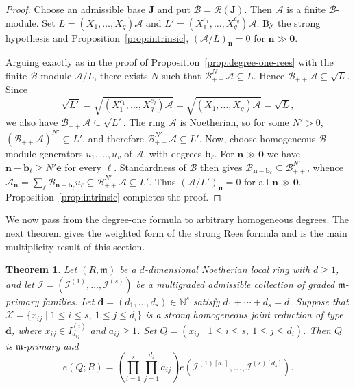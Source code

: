 \documentclass[reqno,12pt]{amsart}
\theoremstyle{plain}
\newtheorem{thm}[prop]{Theorem}
\theoremstyle{definition}
\theoremstyle{remark}
\newcommand{\N}{\mathbb N}
\numberwithin{equation}{section}
\begin{document}
\begin{proof}
Choose an admissible base $\mathbf J$ and put
$\mathcal B=\mathcal R(\mathbf J)$. Then $\mathcal A$ is a finite
$\mathcal B$-module. Set
$L=(X_1,\ldots,X_q)\mathcal A$ and
$L'=(X_1^{c_1},\ldots,X_q^{c_q})\mathcal A$. By the strong hypothesis
and Proposition~\ref{prop:intrinsic}, $(\mathcal A/L)_{\mathbf n}=0$
for $\mathbf n\gg\mathbf0$.

Arguing exactly as in the proof of
Proposition~\ref{prop:degree-one-rees} with the finite
$\mathcal B$-module $\mathcal A/L$, there exists $N$ such that
$\mathcal B_{++}^{N}\mathcal A\subseteq L$. Hence
$\mathcal B_{++}\mathcal A\subseteq\sqrt L$. Since
\[
\sqrt{L'}=
\sqrt{(X_1^{c_1},\ldots,X_q^{c_q})\mathcal A}
=
\sqrt{(X_1,\ldots,X_q)\mathcal A}
=
\sqrt L,
\]
we also have $\mathcal B_{++}\mathcal A\subseteq\sqrt{L'}$. The ring
$\mathcal A$ is Noetherian, so for some $N'>0$,
$(\mathcal B_{++}\mathcal A)^{N'}\subseteq L'$, and therefore
$\mathcal B_{++}^{N'}\mathcal A\subseteq L'$.
Now, choose homogeneous $\mathcal B$-module generators
$u_1,\ldots,u_v$ of $\mathcal A$, with degrees $\mathbf b_\ell$.
For $\mathbf n\gg\mathbf0$ we have
$\mathbf n-\mathbf b_\ell\geq N'\mathbf e$ for every $\ell$.
Standardness of $\mathcal B$ then gives
$\mathcal B_{\mathbf n-\mathbf b_\ell}
\subseteq\mathcal B_{++}^{N'}$, whence $\mathcal A_{\mathbf n}
=
\sum_\ell\mathcal B_{\mathbf n-\mathbf b_\ell}u_\ell
\subseteq
\mathcal B_{++}^{N'}\mathcal A
\subseteq L'.$
Thus $(\mathcal A/L')_{\mathbf n}=0$ for all
$\mathbf n\gg\mathbf0$. Proposition~\ref{prop:intrinsic} completes the
proof.
\end{proof}

We now pass from the degree-one formula to arbitrary homogeneous
degrees. The next theorem gives the weighted form of the strong Rees
formula and is the main multiplicity result of this section.

\begin{thm}
\label{thm:weighted-strong-rees}
Let $(R,\mathfrak m)$ be a $d$-dimensional Noetherian local ring with
$d\geq1$, and let
$\boldsymbol{\mathcal I}=(\mathcal I^{(1)},\ldots,\mathcal I^{(s)})$
be a multigraded admissible collection of graded
$\mathfrak m$-primary families. Let
$\mathbf d=(d_1,\ldots,d_s)\in\N^s$ satisfy $d_1+\cdots+d_s=d$.
Suppose that $\mathcal X=
\{x_{ij}\mid 1\leq i\leq s,\ 1\leq j\leq d_i\}$
is a strong homogeneous joint reduction of type $\mathbf d$, where
$x_{ij}\in I_{a_{ij}}^{(i)}$ and $a_{ij}\geq1$. Set
$Q=(x_{ij}\mid 1\leq i\leq s,\ 1\leq j\leq d_i)$. Then $Q$ is
$\mathfrak m$-primary and
\[
e(Q;R)
=
\left(\prod_{i=1}^{s}\prod_{j=1}^{d_i}a_{ij}\right)
e\!\left(\mathcal I^{(1)[d_1]},\ldots,
\mathcal I^{(s)[d_s]}\right).
\]
\end{thm}
\end{document}
